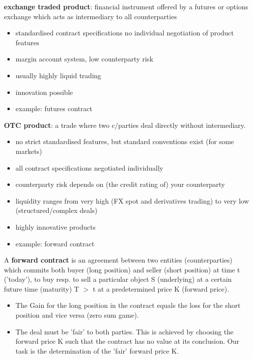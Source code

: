 \begin{dfn}
\textbf{exchange traded product}: financial instrument offered by a futures or options
exchange which acts as intermediary to all counterparties
\begin{itemize}
\item standardised contract specifications
 no individual negotiation of product features
\item margin account system, low counterparty risk
\item usually highly liquid trading
\item innovation possible
\item example: futures contract
\end{itemize}
\textbf{OTC product}: a trade where two c/parties deal directly without intermediary.
\begin{itemize}
\item no strict standardised features, but standard conventions exist (for some markets)
\item all contract specifications negotiated individually
\item  counterparty risk depends on (the credit rating of) your counterparty
\item liquidity ranges from very high (FX spot and derivatives trading) to very low
(structured/complex deals)
\item highly innovative products
\item  example: forward contract
\end{itemize}
\end{dfn}

\begin{dfn}
 A \textbf{forward contract} is an agreement between two entities (counterparties) which
commits both buyer (long position) and seller (short position) at time t ('today'),
to buy resp. to sell a particular object S (underlying) at a certain future time
(maturity) T $\gt$ t at a predetermined price K (forward price).
\end{dfn}

\begin{rem}
\begin{itemize}
 \item The Gain for the long position in the contract equals the loss for the short
position and vice versa (zero sum game).
\item The deal must be 'fair' to both parties. This is achieved by choosing the
forward price K such that the contract has no value at its conclusion. Our
task is the determination of the 'fair' forward price K.
\end{itemize}
\end{rem}

